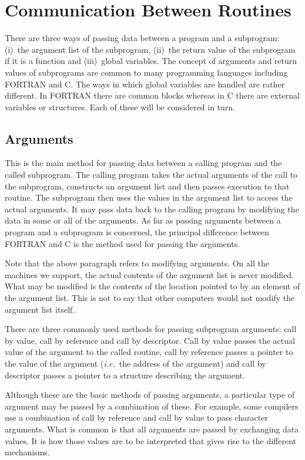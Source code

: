 \documentclass[twoside,11pt]{article}
\newcommand{\xlabel}[1]{}
\renewcommand{\_}{\texttt{\symbol{95}}}
\begin{document}
\section{\xlabel{communication_between_routines}Communication Between Routines}

There are three ways of passing data between a program and a subprogram:
(i)~the argument list of the subprogram, (ii)~the return value of the
subprogram if it is a function and (iii)~global variables. The concept of
arguments and return values of subprograms are common to many programming
languages including FORTRAN and C\@. The ways in which global variables are
handled are rather different. In FORTRAN there are common blocks whereas in C
there are external variables or structures. Each of these will be considered in
turn.

\subsection{\xlabel{arguments}\label{args}Arguments}

This is the main method for passing data between a calling program and the
called subprogram. The calling program takes the actual arguments of the call
to the  subprogram, constructs an argument list and then passes execution to
that routine. The subprogram then uses the values in the argument list to
access the actual arguments. It may pass data back to the calling program by
modifying the data in some or all of the arguments. As far as passing arguments
between a program and a subprogram is concerned, the principal difference
between FORTRAN and C is the method used for passing the arguments.

Note that the above paragraph refers to modifying arguments. 
On all the machines we support, the actual contents of the argument list is 
never modified.
What may be modified is the contents of the location pointed to by an element
of the argument list. This is not to say that other computers would not modify
the argument list itself.

There are three commonly used methods for passing subprogram arguments: call by
value, call by reference and call by descriptor. Call by value passes the
actual value of the argument to the called routine, call by reference passes a
pointer to the value of the argument (\textit{i.e.}\ the address of the 
argument) and call by descriptor passes a pointer to a structure describing 
the argument.

Although these are the basic methods of passing arguments, a particular type of
argument may be passed by a combination of these. For example, some compilers
use a combination of call by reference and call by value to pass character 
arguments.
What is common is that all arguments are passed by exchanging data values. 
It is how those values are to be interpreted that gives rise to the different
mechanisms.
\end{document}
